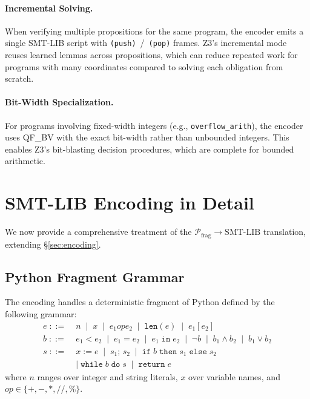 \documentclass[11pt]{article}
\newcommand{\PythonFrag}{\mathcal{P}_{\mathrm{frag}}}
\begin{document}
\paragraph{Incremental Solving.}
When verifying multiple propositions for the same program, the encoder
emits a single SMT-LIB script with \texttt{(push)}~/~\texttt{(pop)}
frames.  Z3's incremental mode reuses learned lemmas across
propositions, which can reduce repeated work for programs with many
coordinates compared to solving each obligation from scratch.

\paragraph{Bit-Width Specialization.}
For programs involving fixed-width integers (e.g., \texttt{overflow\_arith}),
the encoder uses QF\_BV with the exact bit-width rather than unbounded
integers.  This enables Z3's bit-blasting decision procedures, which are
complete for bounded arithmetic.

\section{SMT-LIB Encoding in Detail}\label{sec:smt-detail}

We now provide a comprehensive treatment of the
$\PythonFrag \to \text{SMT-LIB}$ translation, extending
\S\ref{sec:encoding}.

\subsection{Python Fragment Grammar}

The encoding handles a deterministic fragment of Python defined by the
following grammar:
\begin{align*}
  e \;::=\;{} & n \;\mid\; x \;\mid\; e_1 \mathbin{\mathit{op}} e_2
        \;\mid\; \mathtt{len}(e) \;\mid\; e_1[e_2] \\
  b \;::=\;{} & e_1 < e_2 \;\mid\; e_1 = e_2 \;\mid\; e_1 \;\mathtt{in}\; e_2
        \;\mid\; \neg b \;\mid\; b_1 \land b_2 \;\mid\; b_1 \lor b_2 \\
  s \;::=\;{} & x := e \;\mid\; s_1;\, s_2 \;\mid\; \mathtt{if}\; b\;
        \mathtt{then}\; s_1 \;\mathtt{else}\; s_2 \\
        & \mid\; \mathtt{while}\; b \;\mathtt{do}\; s
        \;\mid\; \mathtt{return}\; e
\end{align*}
where $n$ ranges over integer and string literals, $x$ over variable names,
and $\mathit{op} \in \{+, -, *, //, \%\}$.
\end{document}
